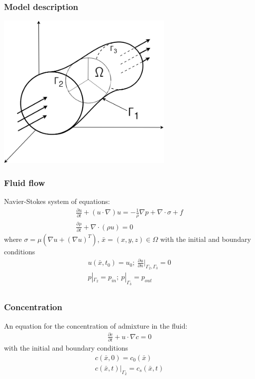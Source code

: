 \documentclass[14pt]{beamer}
\begin{document}
\begin{frame}
\frametitle{Model description}
    \begin{center}
        \includegraphics[width=8.5cm]{area_3d.png}
    \end{center}
\end{frame}

\begin{frame}
\frametitle{Fluid flow}
Navier-Stokes system of equations:
\begin{gather}
    \label{eq:motion}
    \frac{\partial u}{\partial t} + (u \cdot \nabla) u = - \frac{1}{\rho} \nabla p + \nabla \cdot \sigma + f\\
    \label{eq:continuity}
    \frac{\partial \rho}{\partial t} + \nabla \cdot (\rho u) = 0 
\end{gather}
where $\sigma = \mu (\nabla u + (\nabla u)^{T})$, $\bar{x} = (x, y, z) \in \Omega$ with the initial and boundary conditions
\begin{gather*}
    u(\bar{x}, t_0) = u_0;\ \frac{\partial u}{\partial n}|_{\Gamma_2, \Gamma_3} = 0\\
    p|_{\Gamma_2} = p_{in};\ p|_{\Gamma_3} = p_{out} \\
\end{gather*}

\end{frame}

\begin{frame}
\frametitle{Concentration}
An equation for the concentration of admixture in the fluid:
\begin{gather}
    \label{eq:concentration}
    \frac{\partial c}{\partial t} + u \cdot \nabla c = 0
\end{gather}
with the initial and boundary conditions
\begin{gather*}
    c(\bar{x}, 0) = c_0(\bar{x})\\
    c(\bar{x}, t)|_{\Gamma_2} = c_s(\bar{x}, t)
\end{gather*}

\end{frame}
\end{document}
